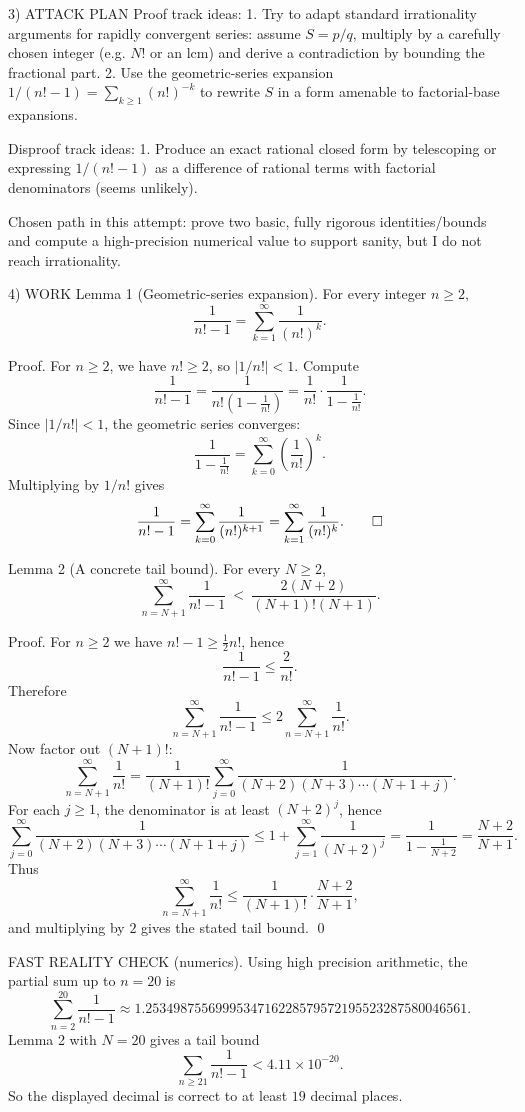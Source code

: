 3) ATTACK PLAN
Proof track ideas:
1. Try to adapt standard irrationality arguments for rapidly convergent series: assume $S=p/q$, multiply by a carefully chosen integer (e.g. $N!$ or an lcm) and derive a contradiction by bounding the fractional part.
2. Use the geometric-series expansion $1/(n!-1)=\sum_{k\ge 1} (n!)^{-k}$ to rewrite $S$ in a form amenable to factorial-base expansions.

Disproof track ideas:
1. Produce an exact rational closed form by telescoping or expressing $1/(n!-1)$ as a difference of rational terms with factorial denominators (seems unlikely).

Chosen path in this attempt: prove two basic, fully rigorous identities/bounds and compute a high-precision numerical value to support sanity, but I do not reach irrationality.

4) WORK
Lemma 1 (Geometric-series expansion).
For every integer $n\ge 2$,
\[\frac{1}{n!-1}=\sum_{k=1}^{\infty}\frac{1}{(n!)^k}.\]

Proof.
For $n\ge 2$, we have $n!\ge 2$, so $|1/n!|<1$.
Compute
\[\frac{1}{n!-1}=\frac{1}{n!\left(1-\frac{1}{n!}\right)}=\frac{1}{n!}\cdot \frac{1}{1-\frac{1}{n!}}.\]
Since $|1/n!|<1$, the geometric series converges:
\[\frac{1}{1-\frac{1}{n!}}=\sum_{k=0}^{\infty}\left(\frac{1}{n!}\right)^k.\]
Multiplying by $1/n!$ gives
\[\frac{1}{n!-1}=\sum_{k=0}^{\infty}\frac{1}{(n!)^{k+1}}=\sum_{k=1}^{\infty}\frac{1}{(n!)^k}.\qed\]

Lemma 2 (A concrete tail bound).
For every $N\ge 2$,
\[\sum_{n=N+1}^{\infty}\frac{1}{n!-1}\ <\ \frac{2(N+2)}{(N+1)!(N+1)}.\]

Proof.
For $n\ge 2$ we have $n!-1\ge \tfrac12 n!$, hence
\[\frac{1}{n!-1}\le \frac{2}{n!}.\]
Therefore
\[\sum_{n=N+1}^{\infty}\frac{1}{n!-1}\le 2\sum_{n=N+1}^{\infty}\frac{1}{n!}.\]
Now factor out $(N+1)!$:
\[\sum_{n=N+1}^{\infty}\frac{1}{n!}=\frac{1}{(N+1)!}\sum_{j=0}^{\infty}\frac{1}{(N+2)(N+3)\cdots(N+1+j)}.\]
For each $j\ge 1$, the denominator is at least $(N+2)^j$, hence
\[\sum_{j=0}^{\infty}\frac{1}{(N+2)(N+3)\cdots(N+1+j)}\le 1+\sum_{j=1}^{\infty}\frac{1}{(N+2)^j}=\frac{1}{1-\frac{1}{N+2}}=\frac{N+2}{N+1}.\]
Thus
\[\sum_{n=N+1}^{\infty}\frac{1}{n!}\le \frac{1}{(N+1)!}\cdot\frac{N+2}{N+1},\]
and multiplying by $2$ gives the stated tail bound. \qed

FAST REALITY CHECK (numerics).
Using high precision arithmetic, the partial sum up to $n=20$ is
\[\sum_{n=2}^{20}\frac{1}{n!-1}\approx 1.2534987556999534716228579572195523287580046561.\]
Lemma 2 with $N=20$ gives a tail bound
\[\sum_{n\ge 21}\frac{1}{n!-1}<4.11\times 10^{-20}.\]
So the displayed decimal is correct to at least $19$ decimal places.


